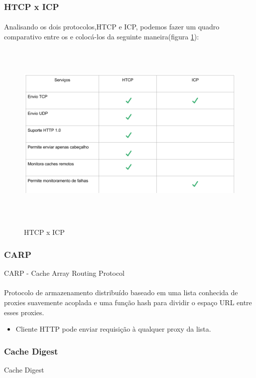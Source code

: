 \subsubsection{HTCP x ICP}
\paragraph{} Analisando os dois protocolos,HTCP e ICP, podemos fazer um quadro comparativo entre os e coloc\'a-los da seguinte maneira(figura \ref{figura:htcp_x_icp}):

\begin{figure}[H]
\caption{HTCP x ICP}
\includegraphics[height=9cm]{Figuras/htcp_x_icp.png} 
\label{figura:htcp_x_icp}
\end{figure}

\subsubsection{CARP}
\label{section:CARP}
CARP -  Cache Array Routing Protocol
\paragraph{} Protocolo de armazenamento distribu\'ido baseado em uma lista conhecida de proxies suavemente acoplada e uma fun\c{c}\~ao hash para dividir o espa\c{c}o URL entre esses proxies.
\begin{itemize}
\item Cliente HTTP pode enviar requisi\c{c}\~ao \`a qualquer proxy da lista.
\end{itemize}

\subsubsection{Cache Digest}
\label{section:Cache Digest}
Cache Digest
